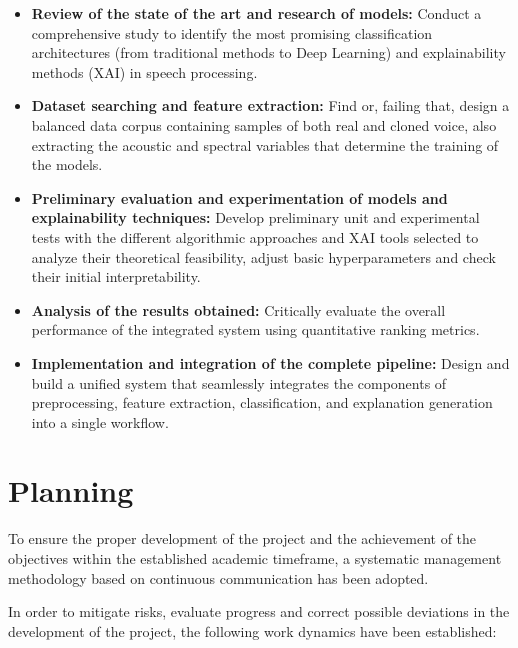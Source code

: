\begin{itemize}
    \item \textbf{Review of the state of the art and research of models:} Conduct a comprehensive study to identify the most promising classification architectures (from traditional methods to Deep Learning) and explainability methods (XAI) in speech processing.
    
    \item \textbf{Dataset searching and feature extraction:} Find or, failing that, design a balanced data corpus containing samples of both real and cloned voice, also extracting the acoustic and spectral variables that determine the training of the models.
    
    \item \textbf{Preliminary evaluation and experimentation of models and explainability techniques:} Develop preliminary unit and experimental tests with the different algorithmic approaches and XAI tools selected to analyze their theoretical feasibility, adjust basic hyperparameters and check their initial interpretability.
    
    	\item \textbf{Analysis of the results obtained:} Critically evaluate the overall performance of the integrated system using quantitative ranking metrics.
    	
    	\item \textbf{Implementation and integration of the complete pipeline:} Design and build a unified system that seamlessly integrates the components of preprocessing, feature extraction, classification, and explanation generation into a single workflow.
\end{itemize}

\section*{Planning}
To ensure the proper development of the project and the achievement of the objectives within the established academic timeframe, a systematic management methodology based on continuous communication has been adopted.

In order to mitigate risks, evaluate progress and correct possible deviations in the development of the project, the following work dynamics have been established:

